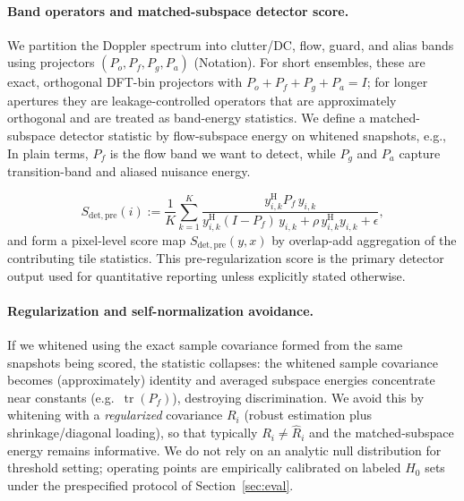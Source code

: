 \documentclass[11pt]{article}
\newcommand{\wh}{\widehat}
\newcommand{\Hh}{^{\mathrm{H}}}
\newcommand{\tr}{\operatorname{tr}}
\newcommand{\Pf}{P_f}
\newcommand{\Pa}{P_a}
\newcommand{\Po}{P_o}
\newcommand{\Pg}{P_g}
\newif\ifPAPERONLY
\begin{document}
\paragraph{Band operators and matched-subspace detector score.}
We partition the Doppler spectrum into clutter/DC, flow, guard, and alias bands using projectors $(\Po,\Pf,\Pg,\Pa)$ (Notation). For short ensembles, these are exact, orthogonal DFT-bin projectors with $\Po+\Pf+\Pg+\Pa=I$; for longer apertures they are leakage-controlled operators that are approximately orthogonal and are treated as band-energy statistics. We define a matched-subspace detector statistic by flow-subspace energy on whitened snapshots, e.g.,
In plain terms, $\Pf$ is the flow band we want to detect, while $\Pg$ and $\Pa$ capture transition-band and aliased nuisance energy.
\ifPAPERONLY
\[
  S_{\mathrm{det}}(i) := \frac{1}{K}\sum_{k=1}^K
  \frac{y_{i,k}\Hh \Pf\, y_{i,k}}{y_{i,k}\Hh (I-\Pf)\, y_{i,k}+\rho\, y_{i,k}\Hh y_{i,k}+\epsilon},
\]
and form a pixel-level score map $S_{\mathrm{det}}(y,x)$ by overlap-add aggregation of the contributing tile statistics. This detector score is the primary output used for quantitative reporting unless explicitly stated otherwise.
\else
\[
  S_{\mathrm{det,pre}}(i) := \frac{1}{K}\sum_{k=1}^K
  \frac{y_{i,k}\Hh \Pf\, y_{i,k}}{y_{i,k}\Hh (I-\Pf)\, y_{i,k}+\rho\, y_{i,k}\Hh y_{i,k}+\epsilon},
\]
and form a pixel-level score map $S_{\mathrm{det,pre}}(y,x)$ by overlap-add aggregation of the contributing tile statistics. This pre-regularization score is the primary detector output used for quantitative reporting unless explicitly stated otherwise.
\fi

\paragraph{Regularization and self-normalization avoidance.}
If we whitened using the exact sample covariance formed from the same snapshots being scored, the statistic collapses: the whitened sample covariance becomes (approximately) identity and averaged subspace energies concentrate near constants (e.g.\ $\tr(\Pf)$), destroying discrimination. We avoid this by whitening with a \emph{regularized} covariance $R_i$ (robust estimation plus shrinkage/diagonal loading), so that typically $R_i \neq \wh R_i$ and the matched-subspace energy remains informative. We do not rely on an analytic null distribution for threshold setting; operating points are empirically calibrated on labeled $H_0$ sets under the prespecified protocol of Section~\ref{sec:eval}.
\end{document}
